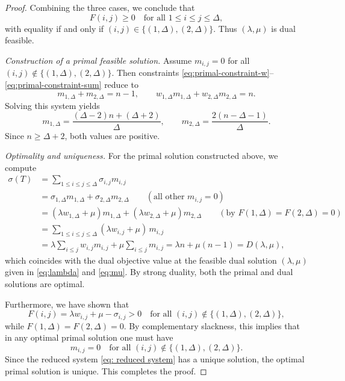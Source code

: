 \documentclass[10pt,a4paper]{amsart}
\begin{document}
\begin{proof}
Combining the three cases, we conclude that
\[
F(i,j)\ge 0 \quad\text{for all }1\le i\le j\le \Delta,
\]
with equality if and only if $(i,j)\in\{(1,\Delta),(2,\Delta)\}$.
Thus $(\lambda,\mu)$ is dual feasible.

\medskip\noindent
\emph{Construction of a primal feasible solution.}
Assume $m_{i,j}=0$ for all $(i,j)\notin\{(1,\Delta),(2,\Delta)\}$.
Then constraints \eqref{eq:primal-constraint-w}--\eqref{eq:primal-constraint-sum}
reduce to
\begin{equation}
\label{eq: reduced system}
m_{1,\Delta}+m_{2,\Delta}=n-1,
\qquad
w_{1,\Delta}m_{1,\Delta}+w_{2,\Delta}m_{2,\Delta}=n.
\end{equation}
Solving this system yields
\[
m_{1,\Delta}=\frac{(\Delta-2)n+(\Delta+2)}{\Delta},
\qquad
m_{2,\Delta}=\frac{2(n-\Delta-1)}{\Delta}.
\]
Since $n\ge\Delta+2$, both values are positive.

\medskip\noindent
\emph{Optimality and uniqueness.}
For the primal solution constructed above, we compute
\begin{align*}
\sigma(T)
&=
\sum_{1\le i\le j\le \Delta} \sigma_{i,j} m_{i,j}\\
&=
\sigma_{1,\Delta}m_{1,\Delta}+\sigma_{2,\Delta}m_{2,\Delta}
\qquad(\text{all other }m_{i,j}=0)\\
&=
(\lambda w_{1,\Delta}+\mu)m_{1,\Delta}+(\lambda w_{2,\Delta}+\mu)m_{2,\Delta}
\qquad(\text{by }F(1,\Delta)=F(2,\Delta)=0)\\
&=
\sum_{1\le i\le j\le \Delta} (\lambda w_{i,j}+\mu)\, m_{i,j}\\
&=
\lambda\sum_{i\le j} w_{i,j} m_{i,j}
+
\mu\sum_{i\le j} m_{i,j}
=
\lambda n + \mu (n-1)
=
D(\lambda,\mu),
\end{align*}
which coincides with the dual objective value at the feasible dual solution
$(\lambda,\mu)$ given in \eqref{eq:lambda} and \eqref{eq:mu}.
By strong duality, both the primal and dual solutions are optimal.

Furthermore, we have shown that
\[
F(i,j)=\lambda w_{i,j}+\mu-\sigma_{i,j}>0
\quad\text{for all }(i,j)\notin\{(1,\Delta),(2,\Delta)\},
\]
while $F(1,\Delta)=F(2,\Delta)=0$.
By complementary slackness, this implies that in any optimal primal solution
one must have
\[
m_{i,j}=0
\quad\text{for all }(i,j)\notin\{(1,\Delta),(2,\Delta)\}.
\]
Since the reduced system \eqref{eq: reduced system}
has a unique solution, the optimal primal solution is unique.
This completes the proof.

\end{proof}
\end{document}
